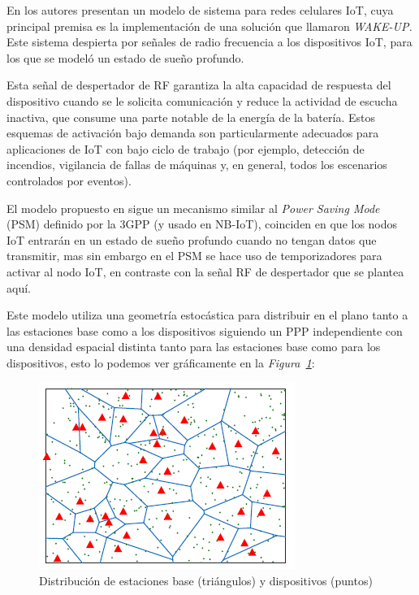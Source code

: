 En \parencite{Kouzayha2018} los autores presentan un modelo de sistema para redes celulares IoT, cuya principal premisa es la implementación de una solución que llamaron \textit{WAKE-UP. }Este sistema despierta por señales de radio frecuencia a los dispositivos IoT, para los que se modeló un estado de sueño profundo.\newline

Esta señal de despertador de RF garantiza la alta capacidad de respuesta del dispositivo cuando se le solicita comunicación y reduce la actividad de escucha inactiva, que consume una parte notable de la energía de la batería. Estos esquemas de activación bajo demanda son particularmente adecuados para aplicaciones de IoT con bajo ciclo de trabajo (por ejemplo, detección de incendios, vigilancia de fallas de máquinas y, en general, todos los escenarios controlados por eventos). \newline

El modelo propuesto en \parencite{Kouzayha2018} sigue un mecanismo similar al \textit{Power Saving Mode} (PSM) definido por la 3GPP (y usado en NB-IoT), coinciden en que los nodos IoT entrarán en un estado de sueño profundo cuando no tengan datos que transmitir, mas sin embargo en el PSM se hace uso de temporizadores para activar al nodo IoT, en contraste con la señal RF de despertador que se plantea aquí.\newline

Este modelo utiliza una geometría estocástica para distribuir en el plano tanto a las estaciones base como a los dispositivos siguiendo un PPP independiente con una densidad espacial distinta tanto para las estaciones base como para los dispositivos, esto lo podemos ver gráficamente en la \textit{Figura~\ref{fig:distribuBS}}:

\begin{figure}[th]
\centering
\includegraphics[scale=.8]{Figures/Distribución de estaciones base (triángulos) y dispositivos (puntos)}
\decoRule
\caption[Distribución de estaciones base y dispositivos]{Distribución de estaciones base (triángulos) y dispositivos (puntos)}
\label{fig:distribuBS}
\end{figure}

